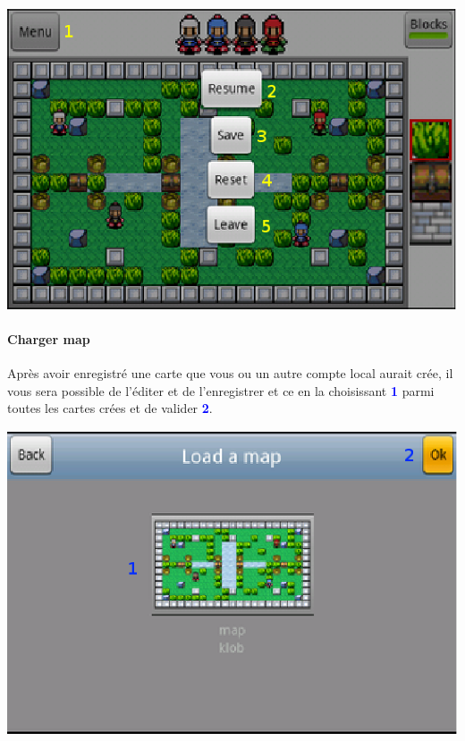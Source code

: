 	\begin{center}
		\includegraphics[scale=0.7]{Manuel/Img/13.eps}
	\end{center}
	
	\paragraph{Charger map\\}
	Après avoir enregistré une carte que vous ou un autre compte local aurait crée,
	il vous sera possible de l'éditer et de l'enregistrer et ce en la choisissant
	\textcolor{blue}{\textbf{1}} parmi toutes les cartes crées et de valider
	\textcolor{blue}{\textbf{2}}. 
	
	\begin{center}
		\includegraphics[scale=0.7]{Manuel/Img/14.eps}
	\end{center}
	


